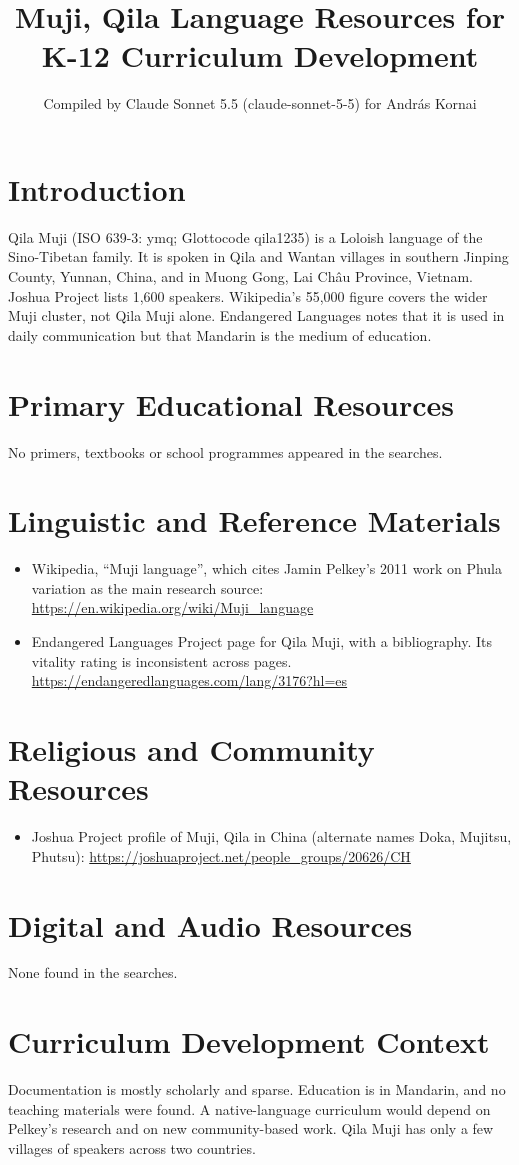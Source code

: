 \documentclass[12pt]{article}
\title{Muji, Qila Language Resources for K-12 Curriculum Development}
\author{Compiled by Claude Sonnet 5.5 (claude-sonnet-5-5) for Andr\'as Kornai}
\date{}
\begin{document}
\maketitle

\section{Introduction}
Qila Muji (ISO 639-3: ymq; Glottocode qila1235) is a Loloish language of the Sino-Tibetan family. It is spoken in Qila and Wantan villages in southern Jinping County, Yunnan, China, and in Muong Gong, Lai Ch\^au Province, Vietnam. Joshua Project lists 1,600 speakers. Wikipedia's 55,000 figure covers the wider Muji cluster, not Qila Muji alone. Endangered Languages notes that it is used in daily communication but that Mandarin is the medium of education.

\section{Primary Educational Resources}
No primers, textbooks or school programmes appeared in the searches.

\section{Linguistic and Reference Materials}
\begin{itemize}
\item Wikipedia, ``Muji language'', which cites Jamin Pelkey's 2011 work on Phula variation as the main research source: \url{https://en.wikipedia.org/wiki/Muji_language}
\item Endangered Languages Project page for Qila Muji, with a bibliography. Its vitality rating is inconsistent across pages. \url{https://endangeredlanguages.com/lang/3176?hl=es}
\end{itemize}

\section{Religious and Community Resources}
\begin{itemize}
\item Joshua Project profile of Muji, Qila in China (alternate names Doka, Mujitsu, Phutsu): \url{https://joshuaproject.net/people_groups/20626/CH}
\end{itemize}

\section{Digital and Audio Resources}
None found in the searches.

\section{Curriculum Development Context}
Documentation is mostly scholarly and sparse. Education is in Mandarin, and no teaching materials were found. A native-language curriculum would depend on Pelkey's research and on new community-based work. Qila Muji has only a few villages of speakers across two countries.
\end{document}
